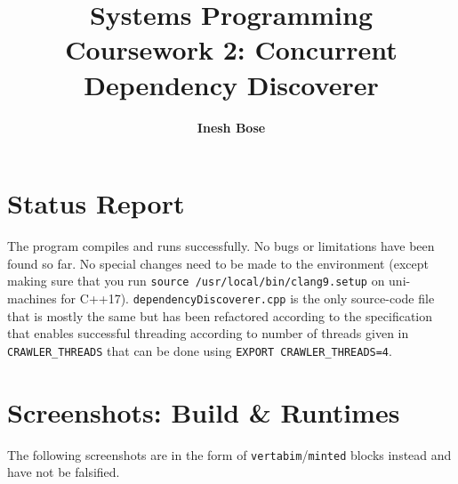 \documentclass{article}
\title{Systems Programming\\ \normalsize{\textbf{Coursework 2:} Concurrent Dependency Discoverer}}
\author{\bf Inesh Bose}
\date{}
\newcommand{\code}[1]{\texttt{#1}}
\begin{document}

\maketitle
\vspace{1cm}

\tableofcontents
{}


\vspace{2cm}

\section{Status Report}

The program compiles and runs successfully. No bugs or limitations have been found so far. No special changes need to be made to the environment (except making sure that you run \code{source /usr/local/bin/clang9.setup} on uni-machines for C++17). \code{dependencyDiscoverer.cpp} is the only source-code file that is mostly the same but has been refactored according to the specification that enables successful threading according to number of threads given in \code{CRAWLER\_THREADS} that can be done using \code{EXPORT CRAWLER\_THREADS=4}.

\vspace{1cm}


\newpage

\section{Screenshots: Build \& Runtimes}

\vspace{0.2cm}

The following screenshots are in the form of \code{vertabim}/\code{minted} blocks instead and have not be falsified.

\vspace{0.5cm}
\end{document}
